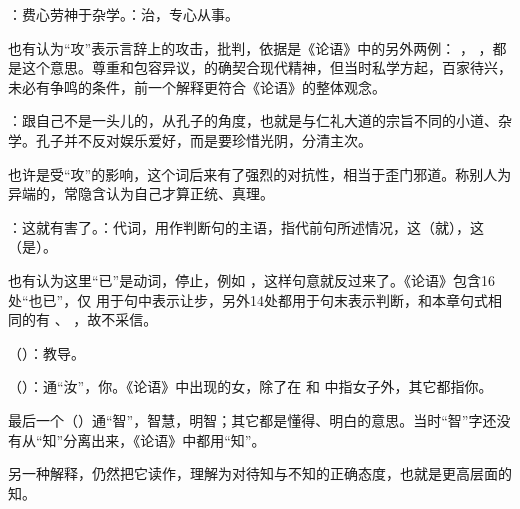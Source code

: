 {
\item {}：费心劳神于杂学。：治，专心从事。

也有认为“攻”表示言辞上的攻击，批判，依据是《论语》中的另外两例： ， ，都是这个意思。尊重和包容异议，的确契合现代精神，但当时私学方起，百家待兴，未必有争鸣的条件，前一个解释更符合《论语》的整体观念。

：跟自己不是一头儿的，从孔子的角度，也就是与仁礼大道的宗旨不同的小道、杂学。孔子并不反对娱乐爱好，而是要珍惜光阴，分清主次。

也许是受“攻”的影响，这个词后来有了强烈的对抗性，相当于歪门邪道。称别人为异端的，常隐含认为自己才算正统、真理。

\item {}：这就有害了。：代词，用作判断句的主语，指代前句所述情况，这（就），这（是）。

也有认为这里“已”是动词，停止，例如  ，这样句意就反过来了。《论语》包含16处“也已”，仅  用于句中表示让步，另外14处都用于句末表示判断，和本章句式相同的有  、 ，故不采信。
}
{}


{
\item {}（）：教导。
\item {}（）：通“汝”，你。《论语》中出现的女，除了在  和  中指女子外，其它都指你。
\item {}最后一个（）通“智”，智慧，明智；其它都是懂得、明白的意思。当时“智”字还没有从“知”分离出来，《论语》中都用“知”。

另一种解释，仍然把它读作，理解为对待知与不知的正确态度，也就是更高层面的知。
}
{}  %


